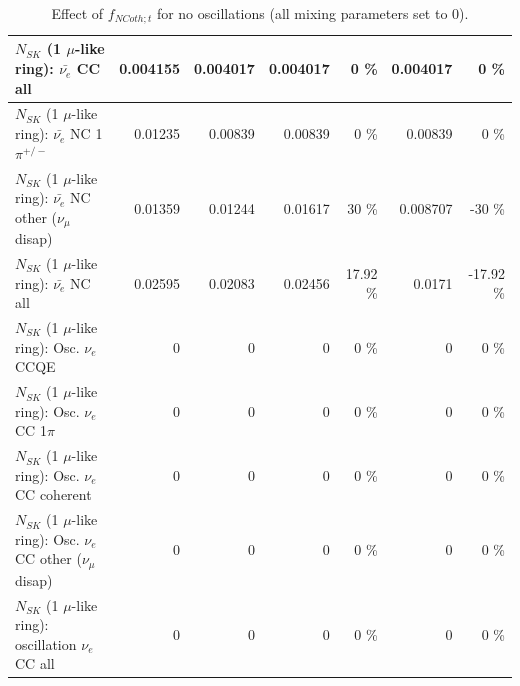 \begin{table}
\begin{tabular}{| l | r | r | r  r | r  r |}
                            $N_{SK}$ (1 $\mu$-like ring): $\bar{\nu_{e}}$ CC all &        0.004155 &        0.004017 &        0.004017 &        0 \%  &        0.004017 &        0 \%  \\ 
\hline
                     $N_{SK}$ (1 $\mu$-like ring): $\bar{\nu_e}$ NC 1$\pi^{+/-}$ &         0.01235 &         0.00839 &         0.00839 &        0 \%  &         0.00839 &        0 \%  \\ 
          $N_{SK}$ (1 $\mu$-like ring): $\bar{\nu_e}$ NC other ($\nu_\mu$ disap) &         0.01359 &         0.01244 &         0.01617 &       30 \%  &        0.008707 &      -30 \%  \\ 
                            $N_{SK}$ (1 $\mu$-like ring): $\bar{\nu_{e}}$ NC all &         0.02595 &         0.02083 &         0.02456 &    17.92 \%  &          0.0171 &   -17.92 \%  \\ 
\hline
\hline
\hline
                                 $N_{SK}$ (1 $\mu$-like ring): Osc. $\nu_e$ CCQE &               0 &               0 &               0 &        0 \%  &               0 &        0 \%  \\ 
                            $N_{SK}$ (1 $\mu$-like ring): Osc. $\nu_e$ CC 1$\pi$ &               0 &               0 &               0 &        0 \%  &               0 &        0 \%  \\ 
                          $N_{SK}$ (1 $\mu$-like ring): Osc. $\nu_e$ CC coherent &               0 &               0 &               0 &        0 \%  &               0 &        0 \%  \\ 
           $N_{SK}$ (1 $\mu$-like ring): Osc. $\nu_e$ CC other ($\nu_\mu$ disap) &               0 &               0 &               0 &        0 \%  &               0 &        0 \%  \\ 
                        $N_{SK}$ (1 $\mu$-like ring): oscillation $\nu_e$ CC all &               0 &               0 &               0 &        0 \%  &               0 &        0 \%  \\ 
\hline
\hline
\end{tabular}
\caption{ Effect of $f_{NCoth; t}$ for no oscillations (all mixing parameters set to 0). }
\label{tab:num_xsec_norm_ncoth_1RmuT_3f_osc_t13:0}
\end{table}
\clearpage
